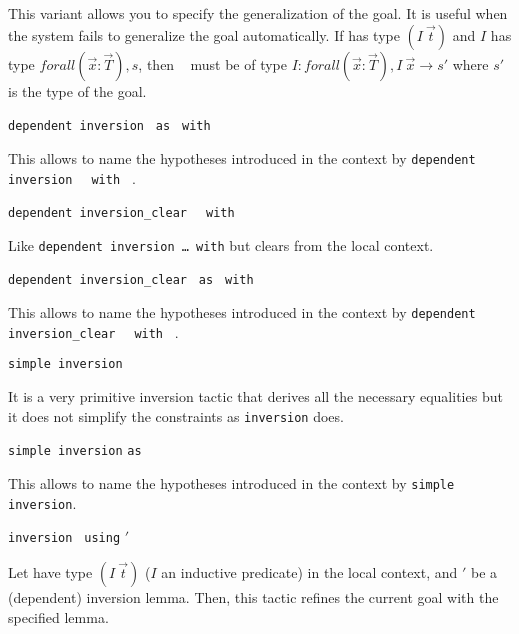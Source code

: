 \begin{coq_example*}
\begin{Variants}
  This variant allows you to specify the generalization of the goal. It
  is useful when the system fails to generalize the goal automatically. If
  {\ident} has type $(I~\vec{t})$ and $I$ has type
  $forall (\vec{x}:\vec{T}), s$,   then \term~  must be of type
  $I:forall (\vec{x}:\vec{T}), I~\vec{x}\to s'$ where $s'$ is the
  type of the goal.

\item {}
  \texttt{dependent inversion } {\ident} \texttt{as} {\intropattern}
  \texttt{ with } \term

  This allows to name the hypotheses introduced in the context by
  \texttt{dependent inversion } {\ident} \texttt{ with } \term.

\item {}
  \texttt{dependent inversion\_clear } {\ident} \texttt{ with } \term

  Like \texttt{dependent inversion \dots\ with} but clears {\ident} from
  the local context.

\item {}
  \texttt{dependent inversion\_clear } {\ident} \texttt{as}
  {\intropattern} \texttt{ with } \term

  This allows to name the hypotheses introduced in the context by
  \texttt{dependent inversion\_clear } {\ident} \texttt{ with } \term.

\item {} \texttt{simple inversion} {\ident}

  It is a very primitive inversion tactic that derives all the necessary
  equalities  but it does not simplify the  constraints as
  \texttt{inversion} does.

\item {} \texttt{simple inversion}
  {\ident} \texttt{as} {\intropattern}

  This allows to name the hypotheses introduced in the context by
  \texttt{simple inversion}.

\item {} \texttt{inversion} \ident
  \texttt{ using} \ident$'$

  Let {\ident} have type $(I~\vec{t})$ ($I$ an inductive
  predicate) in the local context, and \ident$'$ be a (dependent) inversion
  lemma. Then, this tactic refines the current goal with the specified
  lemma.


\end{Variants}
\end{coq_example*}
